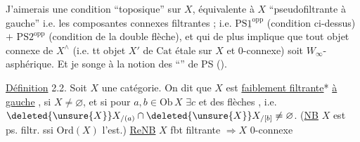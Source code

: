 J'aimerais une condition ``toposique'' sur $X$, équivalente à  $X$ ``pseudofiltrante à gauche'' i.e. les composantes connexes filtrantes ; i.e. $\mathrm{PS}\underline{1}^{\mathrm{opp}}$ (condition \unsure{)} ci-dessus) $+$ $\mathrm{PS}2^{\mathrm{opp}}$ (condition de la double flèche), et qui de plus implique que tout objet connexe de $X^\wedge$ (i.e. tt objet $X'$ de $\mathrm{Cat}$ étale sur $X$ et 0-connexe) soit $W_\infty$-asphérique. Et je songe à la notion des ``'' de PS ().

\uline{Définition}  2.2. Soit $X$ une catégorie. 
On dit que $X$ est \uline{faiblement filtrante}*  \uline{à gauche} ,  si $X\ne\varnothing$, et si pour $a,b\in\mathrm{Ob}\,X$ $\exists c$ et des flèches
, i.e. $\deleted{\unsure{X}} X_{/(a)}\cap\deleted{\unsure{X}}X_{/[b]}\ne\varnothing$.
(\uline{NB} $X$ est ps. filtr.  ssi $\mathrm{Ord}(X)$  l'est.)
\uline{ReNB} $X$ fbt filtrante $\Longrightarrow X$ 0-connexe

